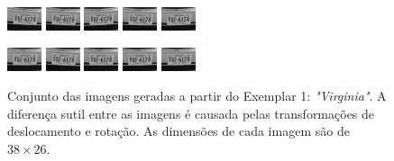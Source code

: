 
\begin{figure}[H]
	\centering
	\caption{\label{fig:frames}
	Conjunto das imagens geradas a partir do Exemplar 1: \emph{"Virginia"}. A diferença sutil entre as imagens é causada pelas transformações de deslocamento e rotação.
	As dimensões de cada imagem são de $38 \times 26$.}
	\includegraphics[width=.15\textwidth]{figures/degradedImg/result-0.png}
	\includegraphics[width=.15\textwidth]{figures/degradedImg/result-1.png}
	\includegraphics[width=.15\textwidth]{figures/degradedImg/result-2.png}
	\includegraphics[width=.15\textwidth]{figures/degradedImg/result-3.png}
	\includegraphics[width=.15\textwidth]{figures/degradedImg/result-4.png}

	\includegraphics[width=.15\textwidth]{figures/degradedImg/result-5.png}
	\includegraphics[width=.15\textwidth]{figures/degradedImg/result-6.png}
	\includegraphics[width=.15\textwidth]{figures/degradedImg/result-7.png}
	\includegraphics[width=.15\textwidth]{figures/degradedImg/result-8.png}
	\includegraphics[width=.15\textwidth]{figures/degradedImg/result-9.png} 


\end{figure}
